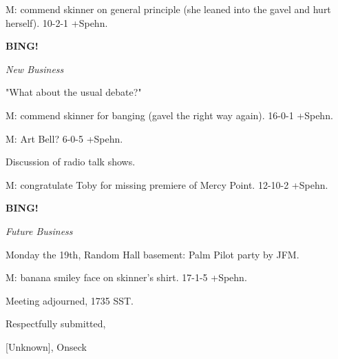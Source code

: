 \documentclass[12pt]{article}
\newcommand{\bing}{{\bf BING!} }
\newcommand{\goto}[1]{\bing \vskip 12pt \centerline{{\em{#1}}}}
\begin{document}
M: commend skinner on general principle (she leaned into the gavel and hurt herself). 10-2-1 +Spehn.

\goto{New Business}

"What about the usual debate?"

M: commend skinner for banging (gavel the right way again). 16-0-1 +Spehn.

M: Art Bell? 6-0-5 +Spehn.

Discussion of radio talk shows.

M: congratulate Toby for missing premiere of Mercy Point. 12-10-2 +Spehn.

\goto{Future Business}

Monday the 19th, Random Hall basement: Palm Pilot party by JFM.

M: banana smiley face on skinner's shirt. 17-1-5 +Spehn.

\vspace{12pt}

\noindent
Meeting adjourned, 1735 SST.

\vspace{18pt}

\centerline{Respectfully submitted,}
\centerline{[Unknown], Onseck}
\end{document}
